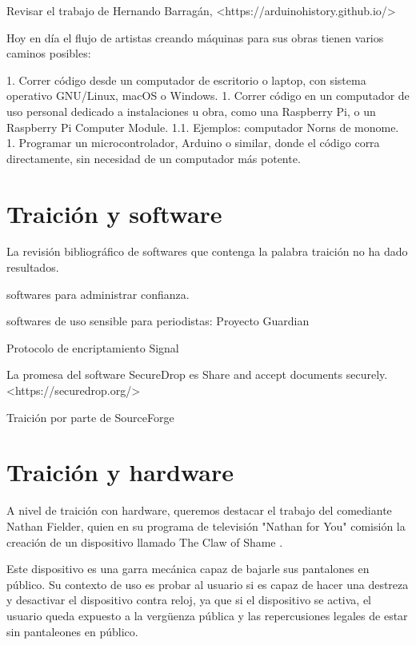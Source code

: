 \documentclass{article}
\begin{document}
Revisar el trabajo de Hernando Barragán, <https://arduinohistory.github.io/>

Hoy en día el flujo de artistas creando máquinas para sus obras tienen varios caminos posibles:

1. Correr código desde un computador de escritorio o laptop, con sistema operativo GNU/Linux, macOS o Windows.
1. Correr código en un computador de uso personal dedicado a instalaciones u obra, como una Raspberry Pi, o un Raspberry Pi Computer Module.
  1.1. Ejemplos: computador Norns de monome.
1. Programar un microcontrolador, Arduino o similar, donde el código corra directamente, sin necesidad de un computador más potente.

\section{Traición y software}

La revisión bibliográfico de softwares que contenga la palabra traición no ha dado resultados.

softwares para administrar confianza.

softwares de uso sensible para periodistas: Proyecto Guardian \cite{guardianProject}

Protocolo de encriptamiento Signal \cite{signal}

La promesa del software SecureDrop es Share and accept documents securely. <https://securedrop.org/>

Traición por parte de SourceForge \cite{sourceForgeWiki} \cite{sourceForgeArs}

\clearpage

\section{Traición y hardware}


A nivel de traición con hardware, queremos destacar el trabajo del comediante Nathan Fielder, quien en su programa de televisión "Nathan for You" comisión la creación de un dispositivo llamado The Claw of Shame \cite{clawOfShame}.

Este dispositivo es una garra mecánica capaz de bajarle sus pantalones en público. Su contexto de uso es probar al usuario si es capaz de hacer una destreza y desactivar el dispositivo contra reloj, ya que si el dispositivo se activa, el usuario queda expuesto a la vergüenza pública y las repercusiones legales de estar sin pantaleones en público.

\clearpage
\end{document}
